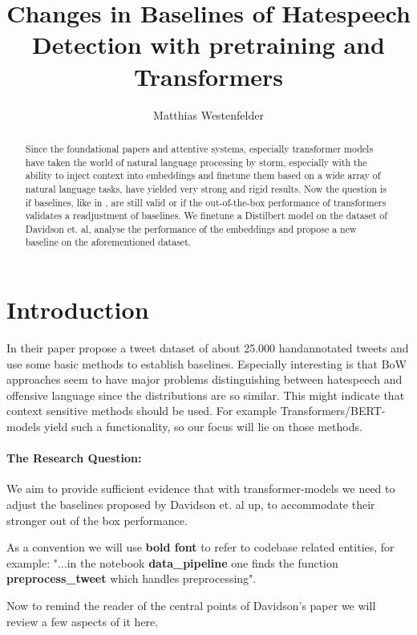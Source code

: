 \documentclass[11pt,a4paper]{article}
\title{Changes in Baselines of Hatespeech Detection with pretraining and Transformers}
\author{Matthias Westenfelder}
\begin{document}
\maketitle
\begin{abstract}
  Since the foundational papers \cite{Attention_is_all_you_need} and \cite{BERT} attentive systems, especially transformer models have 
  taken the world of natural language processing by storm, especially with the ability to inject context into embeddings and
  finetune them based on a wide array of natural language tasks, have yielded very strong and rigid results.
  Now the question is if baselines, like in \cite{auto_hatespeech}, are still valid or if the out-of-the-box performance of transformers
  validates a readjustment of baselines.
  We finetune a Distilbert model on the dataset of Davidson et. al, analyse the performance of the embeddings
  and propose a new baseline on the aforementioned dataset.
\end{abstract}
 

\section{Introduction}
In their paper \cite{auto_hatespeech} propose a tweet dataset of about 25.000 handannotated tweets and use some basic methods to establish baselines.
Especially interesting is that BoW approaches seem to have major problems distinguishing between hatespeech and offensive language since the distributions are so similar.
This might indicate that context sensitive methods should be used. 
For example Transformers/BERT-models yield such a functionality, so our focus will lie on those methods.

\paragraph{The Research Question:} We aim to provide sufficient evidence that with transformer-models we need to adjust the baselines proposed by Davidson et. al up,
to accommodate their stronger out of the box performance.

As a convention we will use \textbf{bold font} to refer to codebase related entities, for example: 
"...in the notebook \textbf{data\_pipeline} one finds the function \textbf{preprocess\_tweet} which handles preprocessing".

Now to remind the reader of the central points of Davidson's paper we will review a few aspects of it here.
\end{document}
